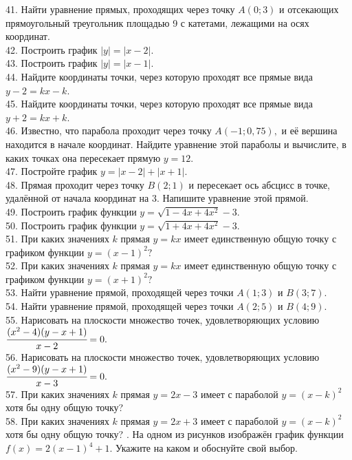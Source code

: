 \documentclass[12pt]{article}
\begin{document}
41. Найти уравнение прямых, проходящих через точку $A(0;3)$ и отсекающих прямоугольный треугольник площадью 9 с катетами, лежащими на осях координат.\\
42. Построить график $|y|=|x-2|.$\\
43. Построить график $|y|=|x-1|.$\\
44. Найдите координаты точки, через которую проходят все прямые вида $y-2=kx-k.$\\
45. Найдите координаты точки, через которую проходят все прямые вида $y+2=kx+k.$\\
46. Известно, что парабола проходит через точку $A(-1;0,75),$ и её вершина находится в начале координат. Найдите уравнение этой параболы и вычислите, в каких точках она пересекает прямую $y=12.$\\
47. Постройте график $y=|x-2|+|x+1|.$\\
48. Прямая проходит через точку $B(2;1)$ и пересекает ось абсцисс в точке, удалённой от начала координат на 3. Напишите уравнение этой прямой.\\
49. Построить график функции $y=\sqrt{1-4x+4x^2}-3.$\\
50. Построить график функции $y=\sqrt{1+4x+4x^2}-3.$\\
51. При каких значениях $k$ прямая $y=kx$ имеет единственную общую точку
с графиком функции $y=(x-1)^2?$\\
52. При каких значениях $k$ прямая $y=kx$ имеет единственную общую точку
с графиком функции $y=(x+1)^2?$\\
53. Найти уравнение прямой, проходящей через точки $A(1;3)$ и $B(3;7).$\\
54. Найти уравнение прямой, проходящей через точки $A(2;5)$ и $B(4;9).$\\
55. Нарисовать на плоскости множество точек, удовлетворяющих условию
$\cfrac{(x^2-4)(y-x+1)}{x-2}=0.$\\
56. Нарисовать на плоскости множество точек, удовлетворяющих условию
$\cfrac{(x^2-9)(y-x+1)}{x-3}=0.$\\
57. При каких значениях $k$ прямая $y=2x-3$ имеет с параболой $y=(x-k)^2$ хотя бы одну общую точку?\\
58. При каких значениях $k$ прямая $y=2x+3$ имеет с параболой $y=(x-k)^2$ хотя бы одну общую точку?
\newpage
{}. На одном из рисунков изображён график функции $f(x)=2(x-1)^4+1.$ Укажите на каком и обоснуйте свой выбор.\\
\end{document}
